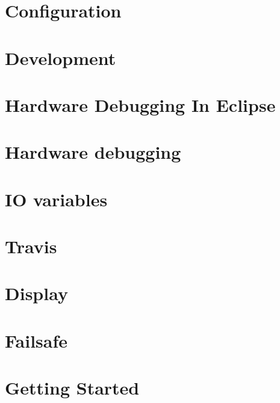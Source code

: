 \documentclass[twoside]{book}
\newcommand{\+}{\discretionary{\mbox{\scriptsize$\hookleftarrow$}}{}{}}
\begin{document}
\chapter{Configuration}
\label{md_docs_development_Configuration_Storage}
\hypertarget{md_docs_development_Configuration_Storage}{}

\chapter{Development}
\label{md_docs_development_Development}
\hypertarget{md_docs_development_Development}{}

\chapter{Hardware Debugging In Eclipse}
\label{md_docs_development_Hardware_Debugging_in_Eclipse}
\hypertarget{md_docs_development_Hardware_Debugging_in_Eclipse}{}

\chapter{Hardware debugging}
\label{md_docs_development_Hardware_Debugging}
\hypertarget{md_docs_development_Hardware_Debugging}{}

\chapter{I\+O variables}
\label{md_docs_development_PID_Internals}
\hypertarget{md_docs_development_PID_Internals}{}

\chapter{Travis}
\label{md_docs_development_Travis}
\hypertarget{md_docs_development_Travis}{}

\chapter{Display}
\label{md_docs_Display}
\hypertarget{md_docs_Display}{}

\chapter{Failsafe}
\label{md_docs_Failsafe}
\hypertarget{md_docs_Failsafe}{}

\chapter{Getting Started}
\label{md_docs_Getting_Started}
\hypertarget{md_docs_Getting_Started}{}

\end{document}
